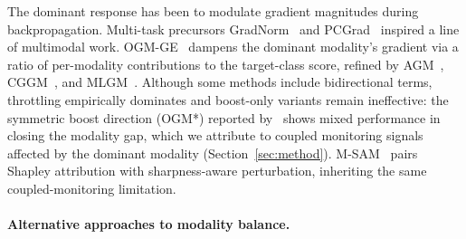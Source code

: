 \documentclass{article}
\begin{document}
The dominant response has been to modulate gradient magnitudes during backpropagation. Multi-task precursors GradNorm~\citep{chen2018gradnorm} and PCGrad~\citep{yu2020pcgrad} inspired a line of multimodal work. OGM-GE~\citep{peng2022ogmge} dampens the dominant modality's gradient via a ratio of per-modality contributions to the target-class score, refined by AGM~\citep{li2023agm}, CGGM~\citep{guo2024cggm}, and MLGM~\citep{kontras2024mlgm}. Although some methods include bidirectional terms, throttling empirically dominates and boost-only variants remain ineffective: the symmetric boost direction (OGM*) reported by~\citet{wei2024opm} shows mixed performance in closing the modality gap, which we attribute to coupled monitoring signals affected by the dominant modality (Section~\ref{sec:method}). M-SAM~\citep{nowdeh2025msam} pairs Shapley attribution with sharpness-aware perturbation, inheriting the same coupled-monitoring limitation.


\paragraph{Alternative approaches to modality balance.}
\end{document}
